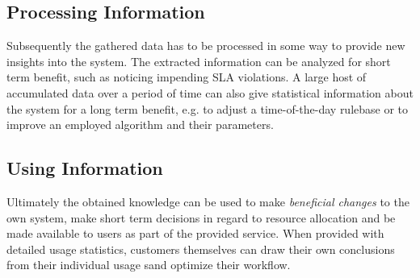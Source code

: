 \documentclass[a4paper]{llncs}
\begin{document}
\subsection{Processing Information}
Subsequently the gathered data has to be processed in some way to provide new insights into the system. The extracted information can be analyzed for short term benefit, such as noticing impending SLA violations. A large host of accumulated data over a period of time can also give statistical information about the system for a long term benefit, e.g. to adjust a time-of-the-day rulebase or to improve an employed algorithm and their parameters.

\subsection{Using Information}
Ultimately the obtained knowledge can be used to make \textit{beneficial changes} to the own system, make short term decisions in regard to resource allocation and be made available to users as part of the provided service. When provided with detailed usage statistics, customers themselves can draw their own conclusions from their individual usage sand optimize their workflow.
\end{document}
